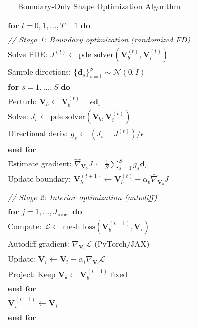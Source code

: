 \documentclass{article}
\begin{document}
\begin{table}[t]
\centering
\caption{Boundary-Only Shape Optimization Algorithm}
\label{alg:boundary_only}
\small
\begin{tabular}{p{}}
\toprule
\textbf{for} $t = 0, 1, \ldots, T-1$ \textbf{do} \\
\quad \emph{// Stage 1: Boundary optimization (randomized FD)} \\
\quad Solve PDE: $J^{(t)} \leftarrow \text{pde\_solver}(\mathbf{V}_b^{(t)}, \mathbf{V}_i^{(t)})$ \\
\quad Sample directions: $\{\mathbf{d}_s\}_{s=1}^S \sim \mathcal{N}(0, I)$ \\
\quad \textbf{for} $s = 1, \ldots, S$ \textbf{do} \\
\quad \quad Perturb: $\tilde{\mathbf{V}}_b \leftarrow \mathbf{V}_b^{(t)} + \epsilon \mathbf{d}_s$ \\
\quad \quad Solve: $J_s \leftarrow \text{pde\_solver}(\tilde{\mathbf{V}}_b, \mathbf{V}_i^{(t)})$ \\
\quad \quad Directional deriv: $g_s \leftarrow (J_s - J^{(t)}) / \epsilon$ \\
\quad \textbf{end for} \\
\quad Estimate gradient: $\hat{\nabla}_{\mathbf{V}_b} J \leftarrow \frac{1}{S} \sum_{s=1}^S g_s \mathbf{d}_s$ \\
\quad Update boundary: $\mathbf{V}_b^{(t+1)} \leftarrow \mathbf{V}_b^{(t)} - \alpha_b \hat{\nabla}_{\mathbf{V}_b} J$ \\
\\
\quad \emph{// Stage 2: Interior optimization (autodiff)} \\
\quad \textbf{for} $j = 1, \ldots, J_{\text{inner}}$ \textbf{do} \\
\quad \quad Compute: $\mathcal{L} \leftarrow \text{mesh\_loss}(\mathbf{V}_b^{(t+1)}, \mathbf{V}_i)$ \\
\quad \quad Autodiff gradient: $\nabla_{\mathbf{V}_i} \mathcal{L}$ (PyTorch/JAX) \\
\quad \quad Update: $\mathbf{V}_i \leftarrow \mathbf{V}_i - \alpha_i \nabla_{\mathbf{V}_i} \mathcal{L}$ \\
\quad \quad Project: Keep $\mathbf{V}_b \leftarrow \mathbf{V}_b^{(t+1)}$ fixed \\
\quad \textbf{end for} \\
\quad $\mathbf{V}_i^{(t+1)} \leftarrow \mathbf{V}_i$ \\
\textbf{end for} \\
\bottomrule
\end{tabular}
\end{table}
\end{document}
